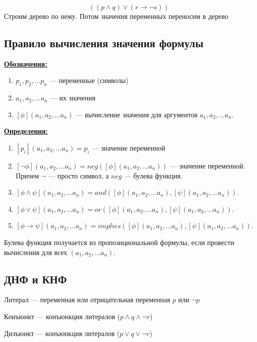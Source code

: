 $$((p\wedge q)\vee(r\rightarrow \neg s))$$
Строим дерево по нему. Потом значения переменных переносим в дерево
\subsection{Правило вычисления значения формулы}
\noindent\textbf{\underline{Обозначения:}}
\begin{enumerate}
    \item $p_1, p_2, \dots p_n$ --- переменные (символы)
    \item $a_1, a_2, \dots a_n$ --- их значения
    \item $[\phi](a_1, a_2, \dots a_n)$ --- вычисление значения для аргументов $a_1, a_2, \dots a_n$.
\end{enumerate}
\noindent\textbf{\underline{Определения:}}
\begin{enumerate}
    \item $[p_i](a_1, a_2, \dots a_n) = p_i$ --- значение переменной
    \item $[\neg\phi](a_1, a_2, \dots a_n) = neg([\phi](a_1, a_2, \dots a_n))$ --- значение переменной. Причем $\neg$ --- просто символ, а $neg$ --- булева функция.
    \item $[\phi \wedge \psi](a_1, a_2, \dots a_n) = and([\phi](a_1, a_2, \dots a_n), [\psi](a_1, a_2, \dots a_n))$.
    \item $[\phi \vee \psi](a_1, a_2, \dots a_n) = or([\phi](a_1, a_2, \dots a_n), [\psi](a_1, a_2, \dots a_n))$.
    \item $[\phi \rightarrow \psi](a_1, a_2, \dots a_n) = implies([\phi](a_1, a_2, \dots a_n), [\psi](a_1, a_2, \dots a_n))$.
\end{enumerate}
Булева функция получается из пропозициональной формулы, если провести вычисления для всех $(a_1, a_2, \dots a_n)$.

\subsection{ДНФ и КНФ}
\begin{definition}
    Литерал --- переменная или отрицательная переменная $p$ или $\neg p$
\end{definition}

\begin{definition}
    Конъюнкт --- конъюнкция литералов ($p \wedge q\wedge\neg r$)
\end{definition}

\begin{definition}
    Дизъюнкт --- конъюнкция литералов ($p \vee q\vee\neg r$)
\end{definition}


